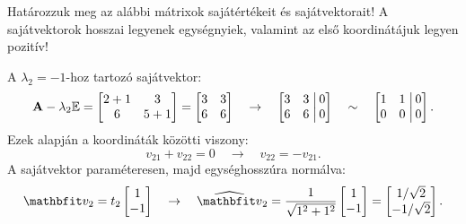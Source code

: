 \begin{exercise}{%
    Határozzuk meg az alábbi mátrixok sajátértékeit és sajátvektorait!
    A sajátvektorok hosszai legyenek egységnyiek, valamint az első koordinátájuk
    legyen pozitív!
  }
{  A $\lambda_2 = -1$-hoz tartozó sajátvektor:
  \[
    \mathbf{A} - \lambda_2 {\mathbb{E}} = \begin{bmatrix}
      2 + 1 & 3     \\
      6     & 5 + 1
    \end{bmatrix} = \begin{bmatrix}
      3 & 3 \\
      6 & 6
    \end{bmatrix}
    \quad \rightarrow \quad
    \left[\begin{matrix}
        3 & 3 \\
        6 & 6
      \end{matrix}\right.\left|\begin{matrix}
        \,0 \\ \,0
      \end{matrix}\right]
    \quad \sim \quad
    \left[\begin{matrix}
        1 & 1 \\
        0 & 0
      \end{matrix}\right.\left|\begin{matrix}
        \,0 \\ \,0
      \end{matrix}\right]
    \text{.}
  \]
  Ezek alapján a koordináták közötti viszony:
  \[
    v_{21} + v_{22} = 0
    \quad \rightarrow \quad
    v_{22} = -v_{21}
    \text{.}
  \]
  A sajátvektor paraméteresen, majd egységhosszúra normálva:
  \[
    \rvec v_2 = t_2 \begin{bmatrix}
      1 \\ -1
    \end{bmatrix}
    \quad
    \rightarrow
    \quad
    \uvec v_2 = \frac{1}{\sqrt{1^2 + 1^2}}\begin{bmatrix}
      1 \\ -1
    \end{bmatrix} = \begin{bmatrix}
      1 / \sqrt{2} \\
      -1 / \sqrt{2}
    \end{bmatrix}
    \text{.}
  \]

  \tcbline

}
\end{exercise}
